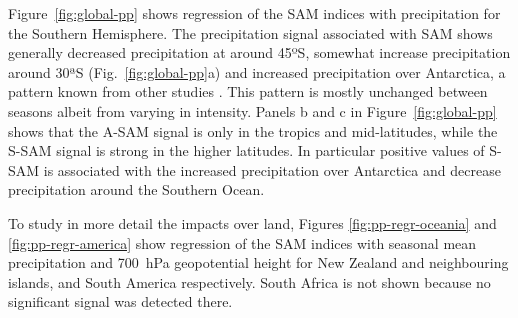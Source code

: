 \documentclass[smallextended]{svjour3}       %
\begin{document}
Figure~\ref{fig:global-pp} shows regression of the SAM indices with precipitation for the Southern Hemisphere. The precipitation signal associated with SAM shows generally decreased precipitation at around 45ºS, somewhat increase precipitation around 30ªS (Fig.~\ref{fig:global-pp}a) and increased precipitation over Antarctica, a pattern known from other studies \citep[e.g.][]{hendon2014}.
This pattern is mostly unchanged between seasons albeit from varying in intensity.
Panels b and c in Figure~\ref{fig:global-pp} shows that the A\nobreakdash-SAM signal is only in the tropics and mid-latitudes, while the S\nobreakdash-SAM signal is strong in the higher latitudes.
In particular positive values of S\nobreakdash-SAM is associated with the increased precipitation over Antarctica and decrease precipitation around the Southern Ocean.

To study in more detail the impacts over land, Figures \ref{fig:pp-regr-oceania} and \ref{fig:pp-regr-america} show regression of the SAM indices with seasonal mean precipitation and 700~hPa geopotential height for New Zealand and neighbouring islands, and South America respectively.
South Africa is not shown because no significant signal was detected there.
\end{document}
